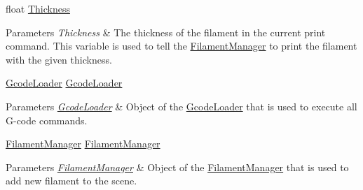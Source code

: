 \begin{DoxyCompactItemize}
\begin{DoxyCompactList}
\end{DoxyCompactList}\item 
\mbox{\label{class_printer_a7c3cca448ff624330921ec4a4a0518cd}} 
float \hyperlink{class_printer_a7c3cca448ff624330921ec4a4a0518cd}{Thickness}
\begin{DoxyCompactList}\small\item\em 
\begin{DoxyParams}{Parameters}
{\em Thickness} & The thickness of the filament in the current print command. This variable is used to tell the \hyperlink{class_filament_manager}{Filament\+Manager} to print the filament with the given thickness.\\
\hline
\end{DoxyParams}
\end{DoxyCompactList}\item 
\mbox{\label{class_printer_a914dcddbf80cec9995ca744674ce5e34}} 
\hyperlink{class_gcode_loader}{Gcode\+Loader} \hyperlink{class_printer_a914dcddbf80cec9995ca744674ce5e34}{Gcode\+Loader}
\begin{DoxyCompactList}\small\item\em 
\begin{DoxyParams}{Parameters}
{\em \hyperlink{class_gcode_loader}{Gcode\+Loader}} & Object of the \hyperlink{class_gcode_loader}{Gcode\+Loader} that is used to execute all G-\/code commands.\\
\hline
\end{DoxyParams}
\end{DoxyCompactList}\item 
\mbox{\label{class_printer_a37a3030132627771b1e5725b662eef1b}} 
\hyperlink{class_filament_manager}{Filament\+Manager} \hyperlink{class_printer_a37a3030132627771b1e5725b662eef1b}{Filament\+Manager}
\begin{DoxyCompactList}\small\item\em 
\begin{DoxyParams}{Parameters}
{\em \hyperlink{class_filament_manager}{Filament\+Manager}} & Object of the \hyperlink{class_filament_manager}{Filament\+Manager} that is used to add new filament to the scene.\\
\hline
\end{DoxyParams}
\end{DoxyCompactList}\item 
\mbox{\label{class_printer_abca967ea8795ac4a93a544b71f1e1fcc}} 

\end{DoxyCompactItemize}
